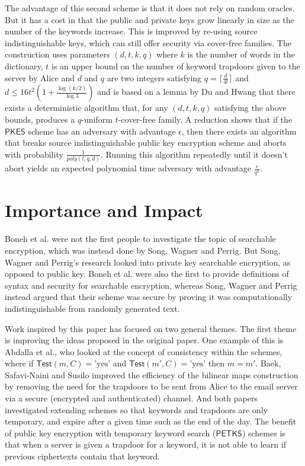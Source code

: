 \documentclass[a4paper,11pt]{article}
\begin{document}
    The advantage of this second scheme is that it does not rely on random oracles. But it has a cost in that the public and private keys grow linearly in size as the number of the keywords increase. This is improved by re-using source indistinguishable keys, which can still offer security via cover-free families. The construction uses parameters $(d, t, k, q)$ where $k$ is the number of words in the dictionary, $t$ is an upper bound on the number of keyword trapdoors given to the server by Alice and $d$ and $q$ are two integers satisfying $q = \lceil \frac{d}{4t} \rceil$ and $d \leq 16t^2(1 + \frac{\log(k/2)}{\log 3})$ and is based on a lemma by Du and Hwang that there exists a deterministic algorithm that, for any $(d, t, k, q)$ satisfying the above bounds, produces a $q$-uniform $t$-cover-free family. A reduction shows that if the $\mathsf{PKES}$ scheme has an adversary with advantage $\epsilon$, then there exists an algorithm that breaks source indistinguishable public key encryption scheme and aborts with probability $\frac{1}{poly(t, q, d)}$. Running this algorithm repeatedly until it doesn't abort yields an expected polynomial time adversary with advantage $\frac{\epsilon}{q^2}$.

    \section{Importance and Impact}
    Boneh et al. were not the first people to investigate the topic of searchable encryption, which was instead done by Song, Wagner and Perrig\cite{848445}. But Song, Wagner and Perrig's research looked into private key searchable encryption, as opposed to public key. Boneh et al. were also the first to provide definitions of syntax and security for searchable encryption, whereas Song, Wagner and Perrig instead argued that their scheme was secure by proving it was computationally indistinguishable from randomly generated text.

    Work inspired by this paper has focused on two general themes. The first theme is improving the ideas proposed in the original paper. One example of this is Abdalla et al.\cite{abdalla:se-revisited}, who looked at the concept of consistency within the schemes, where if $\mathsf{Test}(m, C) = \text{'yes'}$ and $\mathsf{Test}(m', C) = \text{'yes'}$ then $m = m'$. Baek, Safavi-Naini and Susilo\cite{baek:se-revisited} improved the efficiency of the bilinear maps construction by removing the need for the trapdoors to be sent from Alice to the email server via a secure (encrypted and authenticated) channel. And both papers investigated extending schemes so that keywords and trapdoors are only temporary, and expire after a given time such as the end of the day. The benefit of public key encryption with temporary keyword search ($\mathsf{PETKS}$) schemes is that when a server is given a trapdoor for a keyword, it is not able to learn if previous ciphertexts contain that keyword.
\end{document}
